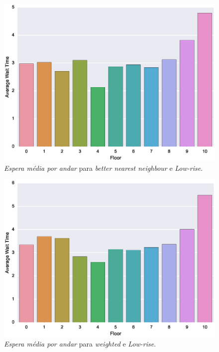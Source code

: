 \begin{figure}[H]
  \centering
  \includegraphics[scale=0.8]{img/results/Low-rise/3_Simple_BetterNearestNeighbour/averageWaitTime}
  \caption{\textit{Espera média por andar} para \textit{better nearest neighbour} e \textit{Low-rise}.}
  \label{fig:result:low-rise:avgwt:bnn}
\end{figure}

\begin{figure}[H]
  \centering
  \includegraphics[scale=0.8]{img/results/Low-rise/4_Simple_Weighted/averageWaitTime}
  \caption{\textit{Espera média por andar} para \textit{weighted} e \textit{Low-rise}.}
  \label{fig:result:low-rise:avgwt:weighted}
\end{figure}

